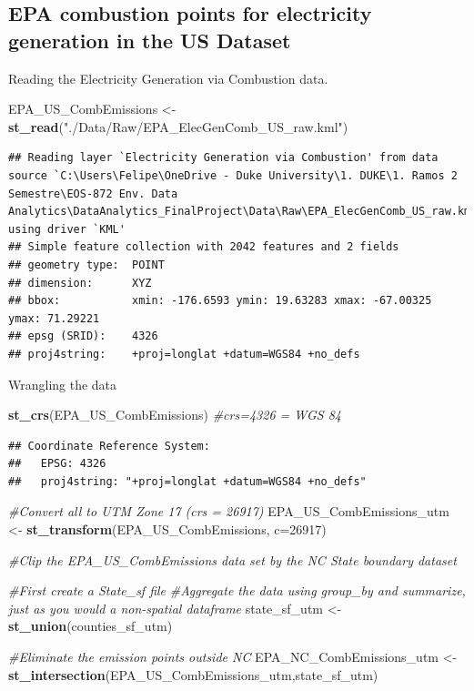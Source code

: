 \documentclass[12pt,]{article}
\newenvironment{Shaded}{\begin{snugshade}}{\end{snugshade}}
\newcommand{\KeywordTok}[1]{\textcolor[rgb]{0.13,0.29,0.53}{\textbf{#1}}}
\newcommand{\DataTypeTok}[1]{\textcolor[rgb]{0.13,0.29,0.53}{#1}}
\newcommand{\DecValTok}[1]{\textcolor[rgb]{0.00,0.00,0.81}{#1}}
\newcommand{\StringTok}[1]{\textcolor[rgb]{0.31,0.60,0.02}{#1}}
\newcommand{\CommentTok}[1]{\textcolor[rgb]{0.56,0.35,0.01}{\textit{#1}}}
\newcommand{\NormalTok}[1]{#1}
\begin{document}
\subsection{EPA combustion points for electricity generation in the US
Dataset}\label{epa-combustion-points-for-electricity-generation-in-the-us-dataset-1}

Reading the Electricity Generation via Combustion data.

\begin{Shaded}
\begin{Highlighting}[]
\NormalTok{EPA_US_CombEmissions <-}\StringTok{ }\KeywordTok{st_read}\NormalTok{(}\StringTok{"./Data/Raw/EPA_ElecGenComb_US_raw.kml"}\NormalTok{)}
\end{Highlighting}
\end{Shaded}

\begin{verbatim}
## Reading layer `Electricity Generation via Combustion' from data source `C:\Users\Felipe\OneDrive - Duke University\1. DUKE\1. Ramos 2 Semestre\EOS-872 Env. Data Analytics\DataAnalytics_FinalProject\Data\Raw\EPA_ElecGenComb_US_raw.kml' using driver `KML'
## Simple feature collection with 2042 features and 2 fields
## geometry type:  POINT
## dimension:      XYZ
## bbox:           xmin: -176.6593 ymin: 19.63283 xmax: -67.00325 ymax: 71.29221
## epsg (SRID):    4326
## proj4string:    +proj=longlat +datum=WGS84 +no_defs
\end{verbatim}

Wrangling the data

\begin{Shaded}
\begin{Highlighting}[]
\KeywordTok{st_crs}\NormalTok{(EPA_US_CombEmissions) }\CommentTok{#crs=4326 = WGS 84}
\end{Highlighting}
\end{Shaded}

\begin{verbatim}
## Coordinate Reference System:
##   EPSG: 4326 
##   proj4string: "+proj=longlat +datum=WGS84 +no_defs"
\end{verbatim}

\begin{Shaded}
\begin{Highlighting}[]
\CommentTok{#Convert all to UTM Zone 17 (crs = 26917)}
\NormalTok{EPA_US_CombEmissions_utm <-}\StringTok{ }\KeywordTok{st_transform}\NormalTok{(EPA_US_CombEmissions, }\DataTypeTok{c=}\DecValTok{26917}\NormalTok{)}

\CommentTok{#Clip the EPA_US_CombEmissions data set by the NC State boundary dataset}

\CommentTok{#First create a State_sf file}
\CommentTok{#Aggregate the data using group_by and summarize, just as you would a non-spatial dataframe}
\NormalTok{state_sf_utm <-}\StringTok{ }\KeywordTok{st_union}\NormalTok{(counties_sf_utm)}

\CommentTok{#Eliminate the emission points outside NC}
\NormalTok{EPA_NC_CombEmissions_utm <-}\StringTok{ }\KeywordTok{st_intersection}\NormalTok{(EPA_US_CombEmissions_utm,state_sf_utm) }
\end{Highlighting}
\end{Shaded}
\end{document}
